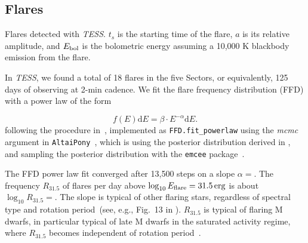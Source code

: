 \documentclass[twocolumn]{aastex631}
\begin{document}
\subsection{Flares}
\label{sec:res:flares}



\begin{table}
\centering
    \caption{Flares detected with \textit{TESS}. $t_s$ is the starting time of the flare, $a$ is its relative amplitude, and $E_{\rm bol}$ is the bolometric energy assuming a 10,000 K blackbody emission from the flare.}
    
        \label{tab:flares}
\end{table}


In \textit{TESS}, we found a total of 18 flares in the five Sectors, or equivalently, 125 days of observing at 2-min cadence. We fit the flare frequency distribution (FFD) with a power law of the form

\begin{equation}
    f(E) \mathrm{d} E = \beta \cdot E^{-\alpha} \mathrm{d} E.
\end{equation}
following the procedure in~\citep{ilin2021flares}, implemented as \texttt{FFD.fit\_powerlaw} using the \textit{mcmc} argument in \texttt{AltaiPony}~\citep{ilin2021altaipony}, which is using the posterior distribution derived in \citet{wheatland2004bayesian}, and sampling the posterior distribution with the \texttt{emcee} package~\citep{foreman-mackey2013emcee}.

The FFD power law fit converged after 13,500 steps on a slope $\alpha =$\ffdalpha\unskip. The frequency $R_{31.5}$ of flares per day above $\log_{10} E_{\rm flare} = 31.5\,\mathrm{erg}$ is about $\log_{10}R_{31.5}=$\ffdr\unskip. The slope is typical of other flaring stars, regardless of spectral type and rotation period~(see, e.g., Fig.~13 in \citealt{ilin2021flares}). $R_{31.5}$ is typical of flaring M dwarfs, in particular typical of late M dwarfs in the saturated activity regime, where $R_{31.5}$ becomes independent of rotation period~\citep{medina2020flare,murray2022study}. 
\end{document}
